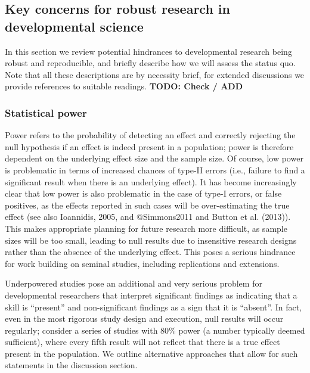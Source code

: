 \documentclass[english,floatsintext,man]{apa6}
\begin{document}
\subsection{Key concerns for robust research in developmental
science}\label{key-concerns-for-robust-research-in-developmental-science}

In this section we review potential hindrances to developmental research
being robust and reproducible, and briefly describe how we will assess
the status quo. Note that all these descriptions are by necessity brief,
for extended discussions we provide references to suitable readings.
\textbf{TODO: Check / ADD}

\subsubsection{Statistical power}\label{statistical-power}

Power refers to the probability of detecting an effect and correctly
rejecting the null hypothesis if an effect is indeed present in a
population; power is therefore dependent on the underlying effect size
and the sample size. Of course, low power is problematic in terms of
increased chances of type-II errors (i.e., failure to find a significant
result when there is an underlying effect). It has become increasingly
clear that low power is also problematic in the case of type-I errors,
or false positives, as the effects reported in such cases will be
over-estimating the true effect (see also Ioannidis, 2005, and
@Simmons2011 and Button et al. (2013)). This makes appropriate planning
for future research more difficult, as sample sizes will be too small,
leading to null results due to insensitive research designs rather than
the absence of the underlying effect. This poses a serious hindrance for
work building on seminal studies, including replications and extensions.

Underpowered studies pose an additional and very serious problem for
developmental researchers that interpret significant findings as
indicating that a skill is \enquote{present} and non-significant
findings as a sign that it is \enquote{absent}. In fact, even in the
most rigorous study design and execution, null results will occur
regularly; consider a series of studies with 80\% power (a number
typically deemed sufficient), where every fifth result will not reflect
that there is a true effect present in the population. We outline
alternative approaches that allow for such statements in the discussion
section.
\end{document}
